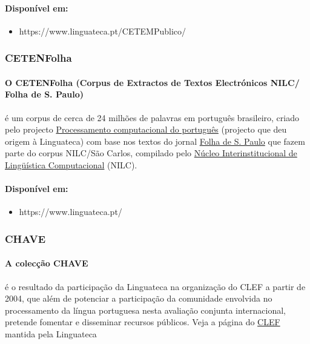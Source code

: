 \documentclass[a4paper, 10pt]{article}
\begin{document}
            	\paragraph{Disponível em:}
            	\begin{itemize}
				    \item https://www.linguateca.pt/CETEMPublico/

			    \end{itemize}
            \subsubsection{CETENFolha}
            	\paragraph{O CETENFolha (Corpus de Extractos de Textos Electrónicos NILC/
            	Folha de S. Paulo)}é um corpus de cerca de 24 milhões de palavras em português brasileiro, criado pelo projecto \href{https://www.linguateca.pt/proc_comp_port.html}{Processamento computacional do português} (projecto que deu origem à Linguateca) com base nos textos do jornal \href{https://www.folha.uol.com.br/}{Folha de S. Paulo} que fazem parte do corpus NILC/São Carlos, compilado pelo \href{http://www.nilc.icmsc.sc.usp.br/}{Núcleo Interinstitucional de Lingüística Computacional} (NILC).
                \paragraph{Disponível em:}
            	\begin{itemize}
				    \item https://www.linguateca.pt/

			    \end{itemize}
            \subsubsection{CHAVE}
            	\paragraph{A colecção CHAVE}
            	é o resultado da participação da Linguateca na organização do CLEF a partir de 2004, que além de potenciar a participação da comunidade envolvida no processamento da língua portuguesa nesta avaliação conjunta internacional, pretende fomentar e disseminar recursos públicos. Veja a página do \href{https://www.linguateca.pt/CLEF/}{CLEF} mantida pela Linguateca
\end{document}
